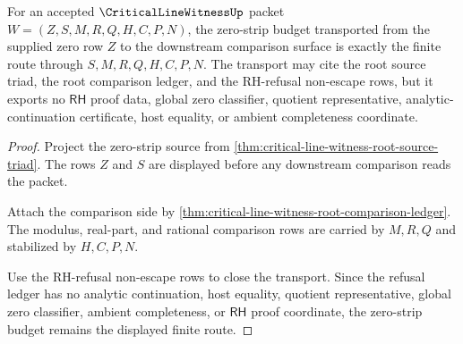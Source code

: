 \begin{theorem}
\label{thm:critical-line-witness-zero-strip-budget-transport}
For an accepted $\CriticalLineWitnessUp$ packet $W=(Z,S,M,R,Q,H,C,P,N)$, the zero-strip budget transported from the supplied zero row $Z$ to the downstream comparison surface is exactly the finite route through $S,M,R,Q,H,C,P,N$. The transport may cite the root source triad, the root comparison ledger, and the RH-refusal non-escape rows, but it exports no $\mathsf{RH}$ proof data, global zero classifier, quotient representative, analytic-continuation certificate, host equality, or ambient completeness coordinate.
\end{theorem}
\begin{proof}
Project the zero-strip source from \autoref{thm:critical-line-witness-root-source-triad}. The rows $Z$ and $S$ are displayed before any downstream comparison reads the packet.

Attach the comparison side by \autoref{thm:critical-line-witness-root-comparison-ledger}. The modulus, real-part, and rational comparison rows are carried by $M,R,Q$ and stabilized by $H,C,P,N$.

Use the RH-refusal non-escape rows to close the transport. Since the refusal ledger has no analytic continuation, host equality, quotient representative, global zero classifier, ambient completeness, or $\mathsf{RH}$ proof coordinate, the zero-strip budget remains the displayed finite route.
\end{proof}

